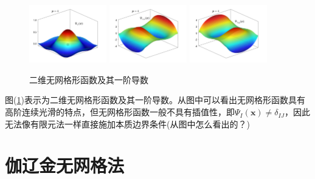 \begin{figure}[H]
\begin{subcaptiongroup}
\label{dshape}
\label{dshape}
\end{subcaptiongroup}
\begin{subcaptiongroup}
\includegraphics[width=0.3\textwidth]{figure/nomesh/Qt1.png}
\label{shape}
\includegraphics[width=0.3\textwidth]{figure/nomesh/Qt2.png}
\label{dshape}
\includegraphics[width=0.3\textwidth]{figure/nomesh/Qt3.png}
\label{dshape}
\label{dshape}
\end{subcaptiongroup}
\caption{二维无网格形函数及其一阶导数}\label{gradient}
\end{figure}
图(\ref{gradient})表示为二维无网格形函数及其一阶导数。从图中可以看出无网格形函数具有高阶连续光滑的特点，但无网格形函数一般不具有插值性，即$\Psi_I(\pmb{x})\ne \delta_{IJ}$，因此无法像有限元法一样直接施加本质边界条件(从图中怎么看出的？)
\section{伽辽金无网格法}
